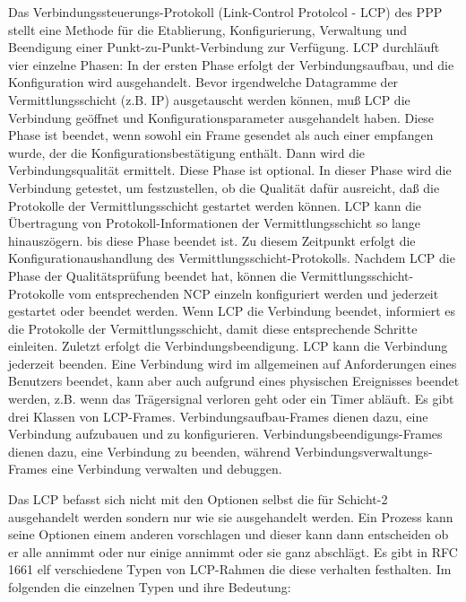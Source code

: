\documentclass[12pt, a4paper, ngerman]{article}
\begin{document}
Das Verbindungssteuerungs-Protokoll (Link-Control Protolcol - LCP) des PPP stellt eine Methode für die Etablierung, Konfigurierung, Verwaltung und Beendigung einer Punkt-zu-Punkt-Verbindung zur Verfügung. LCP durchläuft vier einzelne Phasen:
In der ersten Phase erfolgt der Verbindungsaufbau, und die Konfiguration wird ausgehandelt. Bevor irgendwelche Datagramme der Vermittlungsschicht (z.B. IP) ausgetauscht werden können, muß LCP die Verbindung geöffnet und Konfigurationsparameter ausgehandelt haben. Diese Phase ist beendet, wenn sowohl ein Frame gesendet als auch einer empfangen wurde, der die Konfigurationsbestätigung enthält.
Dann wird die Verbindungsqualität ermittelt. Diese Phase ist optional. In dieser Phase wird die Verbindung getestet, um festzustellen, ob die Qualität dafür ausreicht, daß die Protokolle der Vermittlungsschicht gestartet werden können. LCP kann die Übertragung von Protokoll-Informationen der Vermittlungsschicht so lange hinauszögern. bis diese Phase beendet ist.
Zu diesem Zeitpunkt erfolgt die Konfigurationaushandlung des Vermittlungsschicht-Protokolls. Nachdem LCP die Phase der Qualitätsprüfung beendet hat, können die Vermittlungsschicht-Protokolle vom entsprechenden NCP einzeln konfiguriert werden und jederzeit gestartet oder beendet werden. Wenn LCP die Verbindung beendet, informiert es die Protokolle der Vermittlungsschicht, damit diese entsprechende Schritte einleiten.
Zuletzt erfolgt die Verbindungsbeendigung. LCP kann die Verbindung jederzeit beenden. Eine Verbindung wird im allgemeinen auf Anforderungen eines Benutzers beendet, kann aber auch aufgrund eines physischen Ereignisses beendet werden, z.B. wenn das Trägersignal verloren geht oder ein Timer abläuft.
Es gibt drei Klassen von LCP-Frames. Verbindungsaufbau-Frames dienen dazu, eine Verbindung aufzubauen und zu konfigurieren. Verbindungsbeendigungs-Frames dienen dazu, eine Verbindung zu beenden, während Verbindungsverwaltungs-Frames eine Verbindung verwalten und debuggen.

Das LCP befasst sich nicht mit den Optionen selbst die für Schicht-2 ausgehandelt werden sondern nur wie sie ausgehandelt werden. Ein Prozess kann seine Optionen einem anderen vorschlagen und dieser kann dann entscheiden ob er alle annimmt oder nur einige annimmt oder sie ganz abschlägt. Es gibt in RFC 1661 elf verschiedene Typen von LCP-Rahmen die diese verhalten festhalten. 
Im folgenden die einzelnen Typen und ihre Bedeutung:
\end{document}
